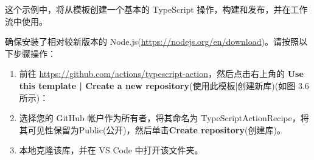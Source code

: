
这个示例中，将从模板创建一个基本的 TypeScript 操作，构建和发布，并在工作流中使用。


确保安装了相对较新版本的 Node.js(\url{https://nodejs.org/en/download})。请按照以下步骤操作：

\begin{enumerate}
\item 
前往 \url{https://github.com/actions/typescript-action}，然后点击右上角的 \textbf{Use this template | Create a new repository}(使用此模板|创建新库)(如图 3.6 所示)：


\item 
选择您的 GitHub 帐户作为所有者，将其命名为 TypeScriptActionRecipe，将其可见性保留为Public(公开)，然后单击\textbf{Create repository}(创建库)。

\item 
本地克隆该库，并在 VS Code 中打开该文件夹。
\end{enumerate}



